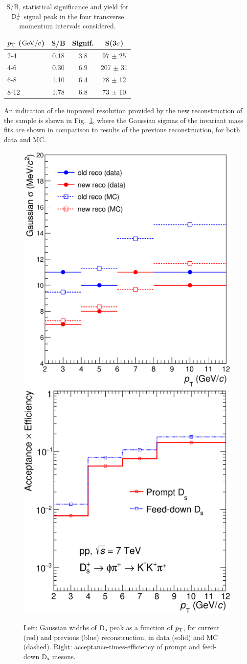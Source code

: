 \begin{table}[tbh!]
\centering
\begin{tabular}{|l|c|c|c|} 
\hline
 $p_{\rm T}$ ($\mathrm{GeV}/c$) & S/B  & Signif. & S(3$\sigma$)\\
\hline
2-4   & 0.18 & 3.8 & 97 $\pm$  25\\
4-6    & 0.30 & 6.9 & 207 $\pm$ 31\\
6-8    & 1.10 & 6.4 & 78 $\pm$ 12\\
8-12  & 1.78 & 6.8 & 73 $\pm$ 10\\
\hline
\end{tabular}
\caption{S/B, statistical significance and yield for ${\rm D_s^{\pm}}$ signal peak in the four transverse momentum intervals considered.} 
\label{tab:signalDs}
\end{table}

An indication of the improved resolution provided by the new 
reconstruction of the sample is shown in Fig.~\ref{fig:sigma4vs2}, where the 
Gaussian sigmas of the invariant mass fits are shown in comparison to 
results of the previous reconstruction, for both data and MC. 
\begin{figure}[!hb]
\begin{center}
\includegraphics[width=.48\textwidth]{FigCap4/Resolutions_pass2_pass4.eps}
\includegraphics[width=.48\textwidth]{FigCap4/AccEff_Ds_Pass4.eps}
\caption{Left: Gaussian widths of ${\rm D_s}$ peak as a function of $p_{\rm T}$, for current (red) and previous (blue) reconstruction, in data (solid) and MC (dashed). Right: acceptance-times-efficiency of prompt and feed-down ${\rm D_s}$ mesons.}
\label{fig:sigma4vs2}
\end{center}
\end{figure}

